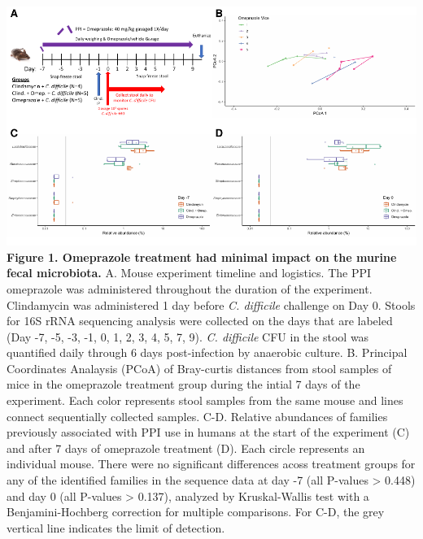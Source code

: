 \documentclass[11pt,]{article}
\begin{document}
\includegraphics{figure_1.pdf} \textbf{Figure 1. Omeprazole treatment
had minimal impact on the murine fecal microbiota.} A. Mouse experiment
timeline and logistics. The PPI omeprazole was administered throughout
the duration of the experiment. Clindamycin was administered 1 day
before \emph{C. difficile} challenge on Day 0. Stools for 16S rRNA
sequencing analysis were collected on the days that are labeled (Day -7,
-5, -3, -1, 0, 1, 2, 3, 4, 5, 7, 9). \emph{C. difficile} CFU in the
stool was quantified daily through 6 days post-infection by anaerobic
culture. B. Principal Coordinates Analaysis (PCoA) of Bray-curtis
distances from stool samples of mice in the omeprazole treatment group
during the intial 7 days of the experiment. Each color represents stool
samples from the same mouse and lines connect sequentially collected
samples. C-D. Relative abundances of families previously associated with
PPI use in humans at the start of the experiment (C) and after 7 days of
omeprazole treatment (D). Each circle represents an individual mouse.
There were no significant differences acoss treatment groups for any of
the identified families in the sequence data at day -7 (all P-values
\textgreater{} 0.448) and day 0 (all P-values \textgreater{} 0.137),
analyzed by Kruskal-Wallis test with a Benjamini-Hochberg correction for
multiple comparisons. For C-D, the grey vertical line indicates the
limit of detection.

\newpage
\end{document}

